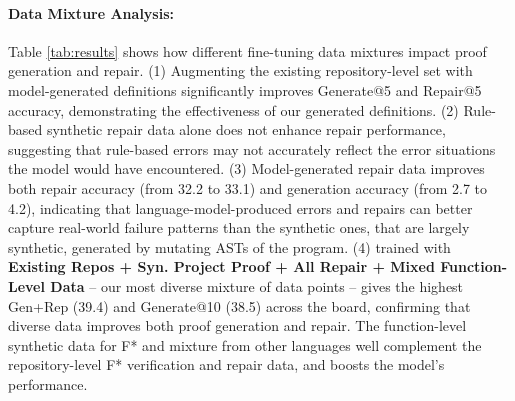 \paragraph{Data Mixture Analysis:} Table \ref{tab:results} shows how different fine-tuning data mixtures impact proof generation and repair. (1) Augmenting the existing repository-level set with model-generated definitions significantly improves Generate@5 and Repair@5 accuracy, demonstrating the effectiveness of our generated definitions. (2) Rule-based synthetic repair data alone does not enhance repair performance, suggesting that rule-based errors may not accurately reflect the error situations the model would have encountered. (3) Model-generated repair data improves both repair accuracy (from 32.2 to 33.1) and generation accuracy (from 2.7 to 4.2), indicating that language-model-produced errors and repairs can better capture real-world failure patterns than the synthetic ones, that are largely synthetic, generated by mutating ASTs of the program. (4) \name trained with \textbf{Existing Repos + Syn. Project Proof + All Repair + Mixed Function-Level Data} -- our most diverse mixture of data points -- gives the highest Gen+Rep (39.4) and Generate@10 (38.5) across the board, confirming that diverse data improves both proof generation and repair. The function-level synthetic data for F* and mixture from other languages well complement the repository-level F* verification and repair data, and boosts the model's performance.  



